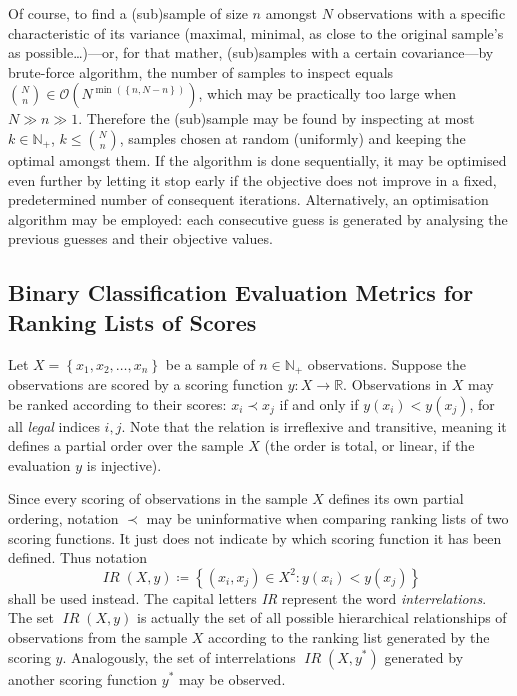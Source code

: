 \documentclass[conference, a4paper, 12pt]{IEEEtran}
\newcommand*{\positives}[1]{{#1}_{{+}}}
\newcommand*{\naturals}{\mathbb{N}}
\newcommand*{\reals}{\mathbb{R}}
\newcommand*{\bigO}{\mathcal{O}}
\DeclareMathOperator{\interrel}{\mathit{IR}}
\begin{document}
    \par

    Of course, to find a (sub)sample of size $ n $ amongst $ N $ observations with a specific characteristic of its variance (maximal, minimal, as close to the original sample's as possible{\ldots})---or, for that mather, (sub)samples with a certain covariance---by brute-force algorithm, the number of samples to inspect equals $ \binom{N}{n} \in \bigO \left( N^{\min \left( \left\{ n , N - n \right\} \right)} \right) $, which may be practically too large when $ N \gg n \gg 1 $. Therefore the (sub)sample may be found by inspecting at most $ k \in \positives{\naturals} $, $ k \leq \binom{N}{n} $, samples chosen at random (uniformly) and keeping the optimal amongst them. If the algorithm is done sequentially, it may be optimised even further by letting it stop early if the objective does not improve in a fixed, predetermined number of consequent iterations. Alternatively, an optimisation algorithm may be employed: each consecutive guess is generated by analysing the previous guesses and their objective values.

    \par

    \subsection{Binary Classification Evaluation Metrics for Ranking Lists of Scores}
    \label{subsec:binary_classification_evaluation_metrics_for_ranking_lists_of_scores}

    Let $ X = \left\{ x_{1} , x_{2} , \dotsc , x_{n} \right\} $ be a sample of $ n \in \positives{\naturals} $ observations. Suppose the observations are scored by a scoring function $ y \colon X \to \reals $. Observations in $ X $ may be ranked according to their scores: $ x_{i} \prec x_{j} $ if and only if $ y \left( x_{i} \right) < y \left( x_{j} \right) $, for all \emph{legal} indices $ i , j $. Note that the relation is irreflexive and transitive, meaning it defines a partial order over the sample $ X $ (the order is total, or linear, if the evaluation $ y $ is injective).

    \par

    Since every scoring of observations in the sample $ X $ defines its own partial ordering, notation $ {\prec} $ may be uninformative when comparing ranking lists of two scoring functions. It just does not indicate by which scoring function it has been defined. Thus notation
    \begin{equation*}
        \interrel \left( X , y \right) \coloneqq \left\{ \left( x_{i} , x_{j} \right) \in X^{2} : y \left( x_{i} \right) < y \left( x_{j} \right) \right\}
    \end{equation*}
    shall be used instead. The capital letters \emph{IR} represent the word \emph{interrelations}. The set $ \interrel \left( X , y \right) $ is actually the set of all possible hierarchical relationships of observations from the sample $ X $ according to the ranking list generated by the scoring $ y $. Analogously, the set of interrelations $ \interrel \left( X , y^{{*}} \right) $ generated by another scoring function $ y^{{*}} $ may be observed.
\end{document}
